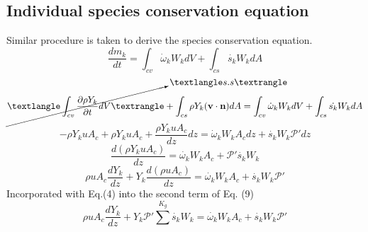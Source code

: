 \documentclass[11pt]{article}
\begin{document}
\subsection{Individual species conservation equation}
Similar procedure is taken to derive the species conservation equation.
\begin{equation}
    \frac{dm_k}{dt} = \int_{cv}\dot\omega_k W_k dV + \int_{cs}\dot{s_k}W_kdA
\end{equation}
\begin{equation}
     \cancelto{〈s.s〉}{〈\int_{cv}\frac{\partial \rho Y_k}{\partial t}dV〉} + \int_{cs} \rho Y_k (\textbf{v} \cdot \textbf{n})dA = \int_{cv}\dot\omega_kW_kdV + \int_{cs}\dot{s_k}W_kdA
\end{equation}
\begin{equation}
    -\rho Y_k u A_c + \rho Y_k u A_c + \frac{\rho Y_k u A_c}{dz}dz = \dot \omega_kW_kA_c dz +\dot{s_k}W_k\mathscr{P}'dz
\end{equation}
\begin{equation}
    \frac{d(\rho Y_k u A_c)}{dz} = \dot{\omega_k}W_kA_c+\mathscr{P}'\dot{s_k}W_k
\end{equation}
\begin{equation}
    \rho u A_c\frac{dY_k}{dz} + Y_k\frac{d(\rho u A_c)}{dz} = \dot{\omega_k}W_kA_c + \dot{s_k}W_k\mathscr{P}'
\end{equation}
Incorporated with Eq.(4) into the second term of Eq. (9)
\begin{equation}
   \boxed{ \rho u A_c\frac{dY_k}{dz} + Y_k\mathscr{P}'\sum^{K_g}\dot{s_k}W_k = \dot{\omega_k}W_kA_c + \dot{s_k}W_k\mathscr{P}'}
\end{equation}

\end{document}

